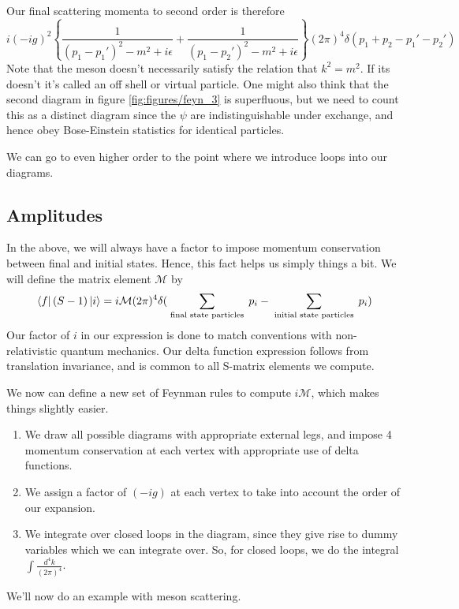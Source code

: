 \documentclass[11pt, oneside]{article}   	%
\theoremstyle{newline}
\theoremstyle{newline}
\theoremstyle{newline}
\theoremstyle{newline}
\theoremstyle{newline}
\begin{document}
Our final scattering momenta to second order 
is therefore 
\[
i (  - i g ) ^ 2 \left\{  \frac{1}{ ( p_1 - p_1 ' ) ^ 2 - m ^ 2 + i \epsilon  } + \frac{1}{ ( p_1 - p_2 ' ) ^ 2 - m ^ 2 + i \epsilon }  \right\} ( 2 \pi ) ^ 4 \delta ( p_1 + p_2 - p_1' - p_2' )  
\] Note that the meson doesn't necessarily satisfy the relation 
that $ k ^ 2 = m ^ 2 $. 
If its doesn't it's called an off shell or virtual particle. 
One might also think that the second diagram in figure 
\ref{fig:figures/feyn_3} is superfluous, but 
we need to count this as a distinct diagram since 
the $ \psi $ are indistinguishable 
under exchange, and hence obey Bose-Einstein statistics
for identical particles.

We can go to even higher order to the point where we 
introduce loops into our diagrams. 


\subsection{Amplitudes} 
In the above, we will always have a factor 
to impose momentum conservation 
between final and initial states. Hence, 
this fact helps us simply things a bit. 
We will define the matrix element $ \mathcal{ M } $ by 
\[
\bra { f} ( S - 1 ) \ket{ i }  = i \mathcal{ M } ( 2 \pi ) ^ 4 \delta ( \sum_{ \text{ final state particles }}  p_i  - \sum_{ \text{ initial state particles }} p_ i ) 
\] Our factor of $ i  $ in our expression 
is done to match conventions with non-relativistic quantum mechanics. 
Our delta function expression follows from translation invariance, and 
is common to all S-matrix elements we compute. 

We now can define a new set of Feynman rules to compute $ i \mathcal{ M  }$, 
which makes things slightly easier. 
\begin{enumerate}
\item We draw all possible diagrams with appropriate external legs, 
and impose 4 momentum conservation at each vertex with appropriate use of delta functions. 
\item We assign a factor of $ ( - ig) $ at each vertex to take into account 
the order of our expansion. 
\item We integrate over closed loops in the diagram, since they give rise
to dummy variables which we can integrate over. So, for closed loops, we 
do the integral $ \int \frac{d^ 4 k }{ ( 2 \pi ) ^ 4 }$. 
\end{enumerate}

We'll now do an example with meson scattering. 
\end{document}
